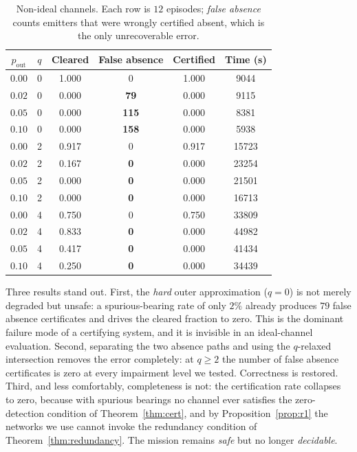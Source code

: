 \documentclass[journal,10pt]{IEEEtran}
\theoremstyle{definition}
\begin{document}
\begin{table}[t]
\caption{Non-ideal channels. Each row is $12$ episodes; \emph{false absence} counts emitters that
were wrongly certified absent, which is the only unrecoverable error.}
\label{tab:outlier}
\centering
\small
\begin{tabular}{cccccc}
\toprule
$p_{\mathrm{out}}$ & $q$ & Cleared & \textbf{False absence} & Certified & Time (s) \\
\midrule
$0.00$ & 0 & 1.000 & 0 & 1.000 & 9044 \\
$0.02$ & 0 & 0.000 & \textbf{79} & 0.000 & 9115 \\
$0.05$ & 0 & 0.000 & \textbf{115} & 0.000 & 8381 \\
$0.10$ & 0 & 0.000 & \textbf{158} & 0.000 & 5938 \\
\midrule
$0.00$ & 2 & 0.917 & 0 & 0.917 & 15723 \\
$0.02$ & 2 & 0.167 & \textbf{0} & 0.000 & 23254 \\
$0.05$ & 2 & 0.000 & \textbf{0} & 0.000 & 21501 \\
$0.10$ & 2 & 0.000 & \textbf{0} & 0.000 & 16713 \\
\midrule
$0.00$ & 4 & 0.750 & 0 & 0.750 & 33809 \\
$0.02$ & 4 & 0.833 & \textbf{0} & 0.000 & 44982 \\
$0.05$ & 4 & 0.417 & \textbf{0} & 0.000 & 41434 \\
$0.10$ & 4 & 0.250 & \textbf{0} & 0.000 & 34439 \\
\bottomrule
\end{tabular}
\end{table}

Three results stand out. First, the \emph{hard} outer approximation ($q=0$) is not merely
degraded but unsafe: a spurious-bearing rate of only $2\%$ already produces $79$ false absence
certificates and drives the cleared fraction to zero. This is the dominant failure mode of a certifying
system, and it is invisible in an ideal-channel evaluation.
Second, separating the two absence paths and using the $q$-relaxed intersection removes the error
completely: at $q\ge2$ the number of false absence certificates is zero at every impairment level
we tested. Correctness is restored. Third, and less comfortably, completeness is not: the
certification rate collapses to zero, because with spurious bearings no channel ever satisfies the
zero-detection condition of Theorem~\ref{thm:cert}, and by
Proposition~\ref{prop:r1} the networks we use cannot invoke the redundancy condition of
Theorem~\ref{thm:redundancy}. The mission remains \emph{safe} but no longer \emph{decidable}.
\end{document}
